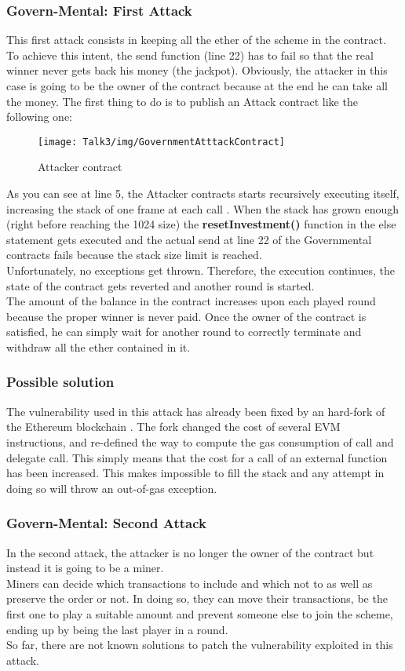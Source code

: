 \subsubsection{Govern-Mental: First Attack}
This first attack consists in keeping all the ether of the scheme in the contract. To achieve this intent, the send function (line 22) has to fail so that the real winner never gets back his money (the jackpot).
Obviously, the attacker in this case is going to be the owner of the contract because at the end he can take all the money.
The first thing to do is to publish an Attack contract like the following one:
\begin{figure}[H]
\begin{center}
\texttt{[image: Talk3/img/GovernmentAtttackContract]}
\end{center}
\caption{Attacker contract}
\label{label}
\end{figure}
As you can see at line 5, the Attacker contracts starts recursively executing itself, increasing the stack of one frame at each call \cite{paper2}.
When the stack has grown enough (right before reaching the 1024 size) the \textbf{resetInvestment()} function in the else statement gets executed and the actual send at line 22 of the Governmental contracts fails because the stack size limit is reached.\\
Unfortunately, no exceptions get thrown. Therefore, the execution continues, the state of the contract gets reverted and another round is started.\\
The amount of the balance in the contract increases upon each played round because the proper winner is never paid. Once the owner of the contract is satisfied, he can simply wait for another round to correctly terminate and withdraw all the ether contained in it.
\subsubsection{Possible solution}
The vulnerability used in this attack has already been fixed by an hard-fork of the Ethereum blockchain \cite{hardfork}. The fork changed the cost of several EVM instructions, and re-defined the way to compute the gas consumption of call and delegate call\cite{paper2}.
This simply means that the cost for a call of an external function has been increased. This makes impossible to fill the stack and any attempt in doing so will throw an out-of-gas exception. \\
\subsubsection{Govern-Mental: Second Attack}
In the second attack, the attacker is no longer the owner of the contract but instead it is going to be a miner.\\
Miners can decide which transactions to include and which not to as well as preserve the order or not\cite{paper2}. In doing so, they can move their transactions, be the first one to play a suitable amount and prevent someone else to join the scheme, ending up by being the last player in a round.\\
So far, there are not known solutions to patch the vulnerability exploited in this attack.


